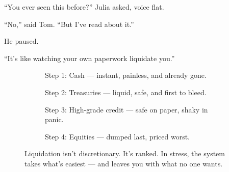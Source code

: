 “You ever seen this before?” Julia asked, voice flat.

“No,” said Tom. “But I’ve read about it.”

He paused.

“It’s like watching your own paperwork liquidate you.”

\medskip

\begin{figure}[H]
  \centering

  \begin{subfigure}[t]{0.45\textwidth}
  \centering
  \caption*{Step 1: Cash — instant, painless, and already gone.}
  \end{subfigure}
  \hfill
  \begin{subfigure}[t]{0.45\textwidth}
  \centering
  \caption*{Step 2: Treasuries — liquid, safe, and first to bleed.}
  \end{subfigure}

  \vspace{1em}

  \begin{subfigure}[t]{0.45\textwidth}
  \centering
  \caption*{Step 3: High-grade credit — safe on paper, shaky in panic.}
  \end{subfigure}
  \hfill
  \begin{subfigure}[t]{0.45\textwidth}
  \centering
  \caption*{Step 4: Equities — dumped last, priced worst.}
  \end{subfigure}

  \caption*{Liquidation isn’t discretionary. It’s ranked. In stress, the system takes what’s easiest — and leaves you with what no one wants.}
\end{figure}

